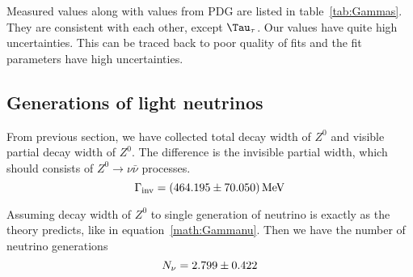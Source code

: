 Measured values along with values from PDG are listed in table~\ref{tab:Gammas}. They are consistent with each other, except $\Tau_\tau$. Our values have quite high uncertainties. This can be traced back to poor quality of fits and the fit parameters have high uncertainties.

\subsection{Generations of light neutrinos}
From previous section, we have collected total decay width of $Z^0$ and visible partial decay width of $Z^0$. The difference is the invisible partial width, which should consists of $Z^0 \rightarrow \nu\bar\nu$ processes.
\begin{equation}
	\Gamma_\text{inv} = \SI{464.195 +- 70.050}{\mega\eV}
\end{equation}

Assuming decay width of $Z^0$ to single generation of neutrino is exactly as the theory predicts, like in equation~\ref{math:Gammanu}. Then we have the number of neutrino generations 
\begin{equation}
	N_{\nu} = \num{2.799 +- 0.422}
\end{equation}
